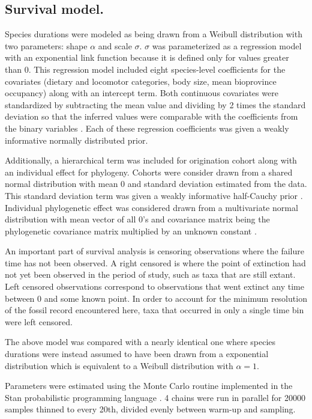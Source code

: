 \documentclass{nature}
\begin{document}
\begin{methods}
  \subsection{Survival model.}

  Species durations were modeled as being drawn from a Weibull distribution with two parameters: shape \(\alpha\) and scale \(\sigma\). \(\sigma\) was parameterized as a regression model with an exponential link function because it is defined only for values greater than 0. This regression model included eight species-level coefficients for the covariates (dietary and locomotor categories, body size, mean bioprovince occupancy) along with an intercept term. Both continuous covariates were standardized by subtracting the mean value and dividing by 2 times the standard deviation so that the inferred values were comparable with the coefficients from the binary variables \cite{Gelman2007}. Each of these regression coefficients was given a weakly informative normally distributed prior.
  
  Additionally, a hierarchical term was included for origination cohort along with an individual effect for phylogeny. Cohorts were consider drawn from a shared normal distribution with mean 0 and standard deviation estimated from the data. This standard deviation term was given a weakly informative half-Cauchy prior \cite{Gelman2013d}. Individual phylogenetic effect was considered drawn from a multivariate normal distribution with mean vector of all 0's and covariance matrix being the phylogenetic covariance matrix multiplied by an unknown constant \cite{Lynch1991,Housworth2004}.

  An important part of survival analysis is censoring observations where the failure time has not been observed. A right censored is where the point of extinction had not yet been observed in the period of study, such as taxa that are still extant. Left censored observations correspond to observations that went extinct any time between 0 and some known point. In order to account for the minimum resolution of the fossil record encountered here, taxa that occurred in only a single time bin were left censored.

  The above model was compared with a nearly identical one where species durations were instead assumed to have been drawn from a exponential distribution which is equivalent to a Weibull distribution with \(\alpha = 1\).

  Parameters were estimated using the Monte Carlo routine implemented in the Stan probabilistic programming language \cite{2014stan}. 4 chains were run in parallel for 20000 samples thinned to every 20th, divided evenly between warm-up and sampling.
  

\end{methods}
\end{document}
